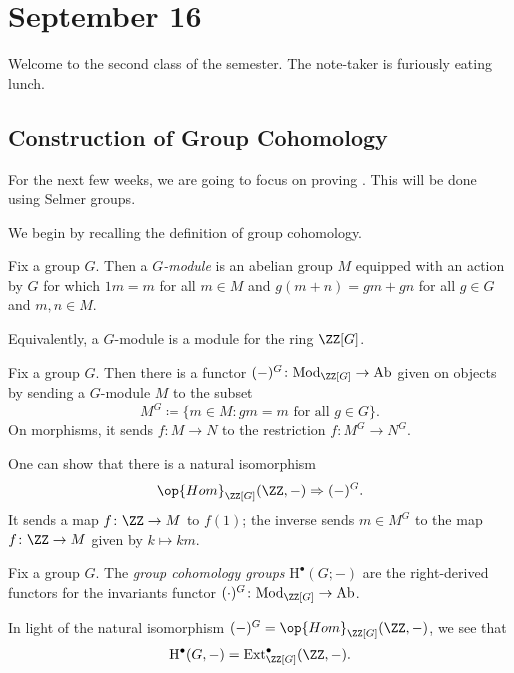 \documentclass[../notes.tex]{subfiles}
\begin{document}
\section{September 16}
Welcome to the second class of the semester. The note-taker is furiously eating lunch.

\subsection{Construction of Group Cohomology}
For the next few weeks, we are going to focus on proving . This will be done using Selmer groups.

We begin by recalling the definition of group cohomology.
\begin{definition}[module]
	Fix a group $G$. Then a \textit{$G$-module} is an abelian group $M$ equipped with an action by $G$ for which $1m=m$ for all $m\in M$ and $g(m+n)=gm+gn$ for all $g\in G$ and $m,n\in M$.
\end{definition}
\begin{remark}
	Equivalently, a $G$-module is a module for the ring $\ZZ[G]$.
\end{remark}
\begin{definition}[invariants]
	Fix a group $G$. Then there is a functor $(-)^G\colon\mathrm{Mod}_{\ZZ[G]}\to\mathrm{Ab}$ given on objects by sending a $G$-module $M$ to the subset
	\[M^G\coloneqq\{m\in M:gm=m\text{ for all }g\in G\}.\]
	On morphisms, it sends $f\colon M\to N$ to the restriction $f\colon M^G\to N^G$.
\end{definition}
\begin{remark}
	One can show that there is a natural isomorphism
	\[\op{Hom}_{\ZZ[G]}(\ZZ,-)\Rightarrow(-)^G.\]
	It sends a map $f\colon\ZZ\to M$ to $f(1)$; the inverse sends $m\in M^G$ to the map $f\colon\ZZ\to M$ given by $k\mapsto km$.
\end{remark}
\begin{definition}
	Fix a group $G$. The \textit{group cohomology groups} $\mathrm H^\bullet(G;-)$ are the right-derived functors for the invariants functor $(\cdot)^G\colon\mathrm{Mod}_{\ZZ[G]}\to\mathrm{Ab}$.
\end{definition}
\begin{remark}
	In light of the natural isomorphism $(-)^G=\op{Hom}_{\ZZ[G]}(\ZZ,-)$, we see that
	\[\mathrm H^\bullet(G,-)=\mathrm{Ext}^\bullet_{\ZZ[G]}(\ZZ,-).\]
\end{remark}
\end{document}
